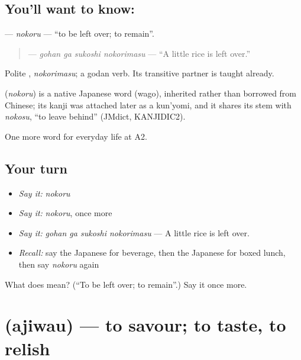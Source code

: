 \subsection*{You'll want to know: }
\textbf{} — \emph{nokoru} — \textquotedblleft{}to be left over; to remain\textquotedblright{}.

\begin{quote}
\textbf{  } — \emph{gohan ga sukoshi nokorimasu} — \textquotedblleft{}A little rice is left over.\textquotedblright{}
\end{quote}

Polite \textbf{}, \emph{nokorimasu}; a godan verb. Its transitive partner \textbf{} is taught already.

\begin{cousinweb}
\textbf{} (\emph{nokoru}) is a native Japanese word (wago), inherited rather than borrowed from Chinese; its kanji was attached later as a kun'yomi, and it shares its stem with \emph{nokosu}, \textquotedblleft{}to leave behind\textquotedblright{} (JMdict, KANJIDIC2).
\end{cousinweb}

\begin{grammarlens}[title={What you've built}]
One more word for everyday life at A2.
\end{grammarlens}

\subsection*{Your turn}
\begin{itemize}
\raggedright
  \item \emph{Say it:} \emph{nokoru}
  \item \emph{Say it:} \emph{nokoru}, once more
  \item \emph{Say it:} \emph{gohan ga sukoshi nokorimasu} — A little rice is left over.
  \item \emph{Recall:} say the Japanese for beverage, then the Japanese for boxed lunch, then say \emph{nokoru} again
\end{itemize}

\begin{tcolorbox}[breakable,colback=teal!4,colframe=teal!35!black,title={Before you move on}]
What does  mean? (\textquotedblleft{}To be left over; to remain\textquotedblright{}.) Say it once more.
\end{tcolorbox}
\section[\texorpdfstring{\ja{あじわう} (ajiwau)}{あじわう (ajiwau)}]{ (ajiwau) — to savour; to taste, to relish}

